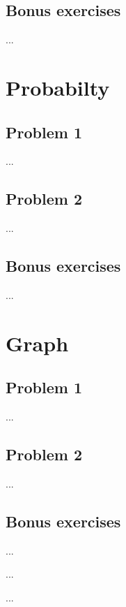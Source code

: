 \documentclass[a4paper]{article}
\begin{document}
    \subsection{Bonus exercises}
    ...



    \section{Probabilty}

    \subsection{Problem 1}
    ...

    \subsection{Problem 2}
    ...

    \subsection{Bonus exercises}
    ...



    \section{Graph}

    \subsection{Problem 1}
    ...

    \subsection{Problem 2}
    ...

    \subsection{Bonus exercises}
    ...

    \begin{thebibliography}{80}


        ...


        ...


    \end{thebibliography}
\end{document}
